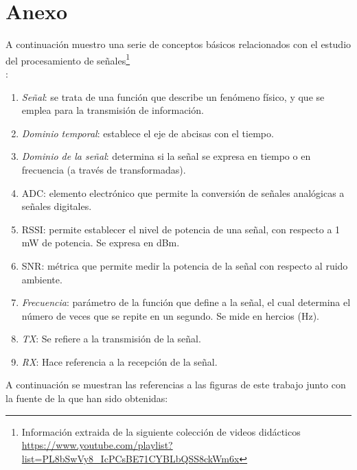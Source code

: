 \chapter{Anexo}
\label{cap:anexo}

A continuación muestro una serie de conceptos básicos relacionados con el estudio del procesamiento de señales\footnote[1]{Información extraida de la siguiente colección de videos didácticos \url{https://www.youtube.com/playlist?list=PL8bSwVy8_IcPCsBE71CYBLbQSS8ckWm6x}}\\:

\begin{enumerate}
	\item \emph{Señal}: se trata de una función que describe un fenómeno físico, y que se emplea para la transmisión de información.

    \item \emph{Dominio temporal}: establece el eje de abcisas con el tiempo.

    \item \emph{Dominio de la señal}: determina si la señal se expresa en tiempo o en frecuencia (a través de transformadas).

    \item \ac{ADC}: elemento electrónico que permite la conversión de señales analógicas a señales digitales.

    \item \ac{RSSI}: permite establecer el nivel de potencia de una señal, con respecto a 1 mW de potencia. Se expresa en dBm.

    \item \ac{SNR}: métrica que permite medir la potencia de la señal con respecto al ruido ambiente.

    \item \emph{Frecuencia}: parámetro de la función que define a la señal, el cual determina el número de veces que se repite en un segundo. Se mide en hercios (Hz).

    \item \emph{TX}: Se refiere a la transmisión de la señal.

    \item \emph{RX}: Hace referencia a la recepción de la señal.
\end{enumerate}

A continuación se muestran las referencias a las figuras de este trabajo junto con la fuente de la que han sido obtenidas:


